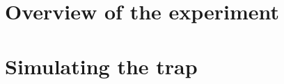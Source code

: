 \documentclass[a4paper, 12pt, twoside]{report}
\begin{document}


%
%
%
%
%

\tableofcontents
\clearpage

\setcounter{page}{5} 



%
%
%

\chapter{Overview of the experiment}
\label{overview}


\chapter{Simulating the trap}
\label{sim}

\end{document}
